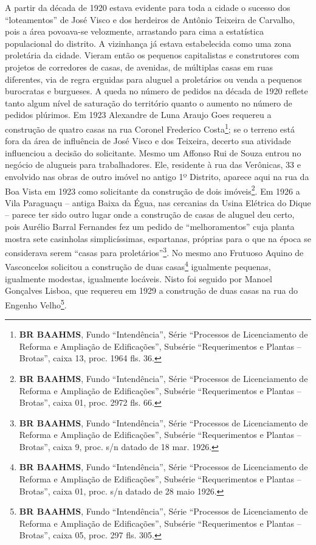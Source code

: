 A partir da década de 1920 estava evidente para toda a cidade o sucesso dos ``loteamentos'' de José Visco e dos herdeiros de Antônio Teixeira de Carvalho, pois a área povoava-se velozmente, arrastando para cima a estatística populacional do distrito. A vizinhança já estava estabelecida como uma zona proletária da cidade. Vieram então os pequenos capitalistas e construtores com projetos de corredores de casas, de avenidas, de múltiplas casas em ruas diferentes, via de regra erguidas para aluguel a proletários ou venda a pequenos burocratas e burgueses. A queda no número de pedidos na década de 1920 reflete tanto algum nível de saturação do território quanto o aumento no número de pedidos plúrimos. Em 1923 Alexandre de Luna Araujo Goes requereu a construção de quatro casas na rua Coronel Frederico Costa\footnote{\textbf{BR BAAHMS}, Fundo ``Intendência'', Série ``Processos de Licenciamento de Reforma e Ampliação de Edificações'', Subsérie ``Requerimentos e Plantas -- Brotas'', caixa 13, proc. 1964 fls. 36.}; se o terreno está fora da área de influência de José Visco e dos Teixeira, decerto sua atividade influenciou a decisão do solicitante. Mesmo um Affonso Rui de Souza entrou no negócio de alugueis para trabalhadores. Ele, residente à rua das Verônicas, 33 e envolvido nas obras de outro imóvel no antigo 1º Distrito, aparece aqui na rua da Boa Vista em 1923 como solicitante da construção de dois imóveis\footnote{\textbf{BR BAAHMS}, Fundo ``Intendência'', Série ``Processos de Licenciamento de Reforma e Ampliação de Edificações'', Subsérie ``Requerimentos e Plantas -- Brotas'', caixa 01, proc. 2972 fls. 66.}. Em 1926 a Vila Paraguaçu -- antiga Baixa da Égua, nas cercanias da Usina Elétrica do Dique \cite[p.~104]{souza_guia_1935} -- parece ter sido outro lugar onde a construção de casas de aluguel deu certo, pois Aurélio Barral Fernandes fez um pedido de ``melhoramentos'' cuja planta mostra sete casinholas simplicíssimas, espartanas, próprias para o que na época se considerava serem ``casas para proletários''\footnote{\textbf{BR BAAHMS}, Fundo ``Intendência'', Série ``Processos de Licenciamento de Reforma e Ampliação de Edificações'', Subsérie ``Requerimentos e Plantas -- Brotas'', caixa 9, proc. s/n datado de 18 mar. 1926.}. No mesmo ano Frutuoso Aquino de Vasconcelos solicitou a construção de duas casas\footnote{\textbf{BR BAAHMS}, Fundo ``Intendência'', Série ``Processos de Licenciamento de Reforma e Ampliação de Edificações'', Subsérie ``Requerimentos e Plantas -- Brotas'', caixa 01, proc. s/n datado de 28 maio 1926.} igualmente pequenas, igualmente modestas, igualmente locáveis. Nisto foi seguido por Manoel Gonçalves Lisboa, que requereu em 1929 a construção de duas casas na rua do Engenho Velho\footnote{\textbf{BR BAAHMS}, Fundo ``Intendência'', Série ``Processos de Licenciamento de Reforma e Ampliação de Edificações'', Subsérie ``Requerimentos e Plantas -- Brotas'', caixa 05, proc. 297 fls. 305.}.

